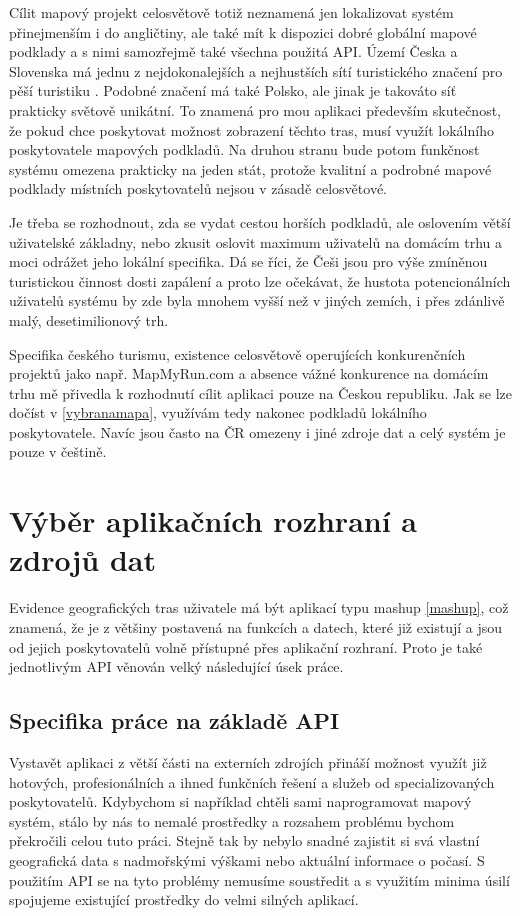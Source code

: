 Cílit mapový projekt celosvětově totiž neznamená jen lokalizovat
systém přinej\-menším i do angličtiny, ale také mít k dispozici dobré
globální mapové podklady a s nimi samozřejmě také všechna použitá
API. Území Česka a Slovenska má jednu z nej\-dokonalejších a nej\-hustších
sítí turistického značení pro pěší turistiku \cite{kct}.
Podobné značení má také Polsko, ale jinak je takováto síť prakticky světově unikátní. To
znamená pro mou aplikaci především skutečnost, že pokud chce
poskytovat možnost zobrazení těchto tras, musí využít lokálního
poskytovatele mapových podkladů. Na druhou stranu bude potom
funkčnost systému omezena prakticky na jeden stát, protože kvalitní a
podrobné mapové podklady místních poskytovatelů nejsou v zásadě
celosvětové.

Je třeba se rozhodnout, zda se vydat cestou horších podkladů, ale
oslovením větší uživatelské základny, nebo zkusit oslovit maximum
uživatelů na domácím trhu a moci odrážet jeho lokální specifika. Dá se
říci, že Češi jsou pro výše zmíněnou turistickou činnost dosti
zapálení \cite{turistika} a proto lze očekávat, že hustota
potencionálních uživatelů systému by zde byla mnohem vyšší než v jiných zemích, i přes zdánlivě
malý, desetimilionový trh.

Specifika českého turismu, existence celosvětově operujících
konkurenčních projektů jako např. MapMyRun.com a absence vážné
konkurence na domácím trhu mě přivedla k rozhodnutí cílit aplikaci
pouze na Českou republiku. Jak se lze dočíst v \ref{vybranamapa},
využívám tedy nakonec podkladů lokálního poskytovatele. Navíc jsou
často na ČR omezeny i jiné zdroje dat a celý systém je pouze v
češtině.

\chapter{Výběr aplikačních rozhraní a zdrojů dat}
Evidence geografických tras uživatele má být aplikací typu mashup
\ref{mashup}, což znamená, že je z většiny postavená na funkcích a
datech, které již existují a jsou od jejich poskytovatelů volně
přístupné přes aplikační rozhraní. Proto je také jednotlivým
API věnován velký následující úsek práce.

\section{Specifika práce na základě API}
Vystavět aplikaci z větší části na externích zdrojích přináší možnost
využít již hotových, profesionálních a ihned funkčních řešení a služeb
od specializovaných poskytovatelů. Kdybychom si například chtěli sami
naprogramovat mapový systém, stálo by nás to nemalé prostředky a
rozsahem problému bychom překročili celou tuto práci. Stejně tak by
nebylo snadné zajistit si svá vlastní geografická data s nadmořskými
výškami nebo aktuální informace o počasí. S použitím API se na tyto
problémy nemusíme soustředit a s využitím minima úsilí spojujeme
existující prostředky do velmi silných aplikací.

